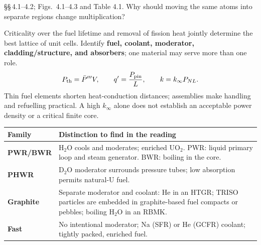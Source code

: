 \documentclass{ne630handout}
\begin{document}
\fontsize{9.5}{11.5}\selectfont
\RaggedRight

 {\S\S\,4.1--4.2; Figs.\ 4.1--4.3 and Table 4.1.}
 {Why should moving the same atoms into separate regions change multiplication?}
\begin{center}\resizebox{.97\linewidth}{!}{\FamilyFigure}\end{center}
\vspace{-7pt}
\colstart
{}
Criticality over the fuel lifetime and removal of fission heat jointly determine the best lattice of unit cells. Identify \textbf{fuel, coolant, moderator, cladding/structure, and absorbers}; one material may serve more than one role.
\[
 P_{\rm th}=\bar P'''V,\qquad q'=\frac{P_{\rm pin}}{L},\qquad
 k=k_\infty P_{NL}.
\]
Thin fuel elements shorten heat-conduction distances; assemblies make handling and refuelling practical. A high $k_\infty$ alone does not establish an acceptable power density or a critical finite core.

\begin{tabularx}{\linewidth}{@{}>{\bfseries}p{.67in}Y@{}}
\toprule
Family & Distinction to find in the reading \\
\midrule
PWR/BWR & H$_2$O cools and moderates; enriched UO$_2$. PWR: liquid primary loop and steam generator. BWR: boiling in the core.\\
PHWR & D$_2$O moderator surrounds pressure tubes; low absorption permits natural-U fuel.\\
Graphite & Separate moderator and coolant: He in an HTGR; TRISO particles are embedded in graphite-based fuel compacts or pebbles; boiling H$_2$O in an RBMK.\\
Fast & No intentional moderator; Na (SFR) or He (GCFR) coolant; tightly packed, enriched fuel.\\
\bottomrule
\end{tabularx}
\end{document}
